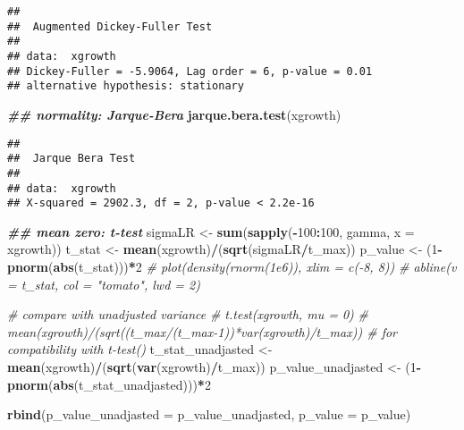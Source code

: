 \documentclass[
]{book}
\newenvironment{Shaded}{\begin{snugshade}}{\end{snugshade}}
\newcommand{\AttributeTok}[1]{\textcolor[rgb]{0.13,0.29,0.53}{#1}}
\newcommand{\CommentTok}[1]{\textcolor[rgb]{0.56,0.35,0.01}{\textit{#1}}}
\newcommand{\DecValTok}[1]{\textcolor[rgb]{0.00,0.00,0.81}{#1}}
\newcommand{\DocumentationTok}[1]{\textcolor[rgb]{0.56,0.35,0.01}{\textbf{\textit{#1}}}}
\newcommand{\FunctionTok}[1]{\textcolor[rgb]{0.13,0.29,0.53}{\textbf{#1}}}
\newcommand{\NormalTok}[1]{#1}
\newcommand{\OtherTok}[1]{\textcolor[rgb]{0.56,0.35,0.01}{#1}}
\newcommand{\SpecialCharTok}[1]{\textcolor[rgb]{0.81,0.36,0.00}{\textbf{#1}}}
\begin{document}
\begin{verbatim}
## 
##  Augmented Dickey-Fuller Test
## 
## data:  xgrowth
## Dickey-Fuller = -5.9064, Lag order = 6, p-value = 0.01
## alternative hypothesis: stationary
\end{verbatim}

\begin{Shaded}
\begin{Highlighting}[]
\DocumentationTok{\#\# normality: Jarque{-}Bera}
\FunctionTok{jarque.bera.test}\NormalTok{(xgrowth)}
\end{Highlighting}
\end{Shaded}

\begin{verbatim}
## 
##  Jarque Bera Test
## 
## data:  xgrowth
## X-squared = 2902.3, df = 2, p-value < 2.2e-16
\end{verbatim}

\begin{Shaded}
\begin{Highlighting}[]
\DocumentationTok{\#\# mean zero: t{-}test}
\NormalTok{sigmaLR }\OtherTok{\textless{}{-}} \FunctionTok{sum}\NormalTok{(}\FunctionTok{sapply}\NormalTok{(}\SpecialCharTok{{-}}\DecValTok{100}\SpecialCharTok{:}\DecValTok{100}\NormalTok{, gamma, }\AttributeTok{x =}\NormalTok{ xgrowth))}
\NormalTok{t\_stat  }\OtherTok{\textless{}{-}} \FunctionTok{mean}\NormalTok{(xgrowth)}\SpecialCharTok{/}\NormalTok{(}\FunctionTok{sqrt}\NormalTok{(sigmaLR}\SpecialCharTok{/}\NormalTok{t\_max))}
\NormalTok{p\_value }\OtherTok{\textless{}{-}}\NormalTok{ (}\DecValTok{1}\SpecialCharTok{{-}}\FunctionTok{pnorm}\NormalTok{(}\FunctionTok{abs}\NormalTok{(t\_stat)))}\SpecialCharTok{*}\DecValTok{2}
\CommentTok{\# plot(density(rnorm(1e6)), xlim = c({-}8, 8))}
\CommentTok{\# abline(v = t\_stat, col = "tomato", lwd = 2)}

\CommentTok{\# compare with unadjusted variance}
\CommentTok{\# t.test(xgrowth, mu = 0)}
\CommentTok{\# mean(xgrowth)/(sqrt((t\_max/(t\_max{-}1))*var(xgrowth)/t\_max)) \# for compatibility with t{-}test()}
\NormalTok{t\_stat\_unadjasted }\OtherTok{\textless{}{-}} \FunctionTok{mean}\NormalTok{(xgrowth)}\SpecialCharTok{/}\NormalTok{(}\FunctionTok{sqrt}\NormalTok{(}\FunctionTok{var}\NormalTok{(xgrowth)}\SpecialCharTok{/}\NormalTok{t\_max))}
\NormalTok{p\_value\_unadjasted }\OtherTok{\textless{}{-}}\NormalTok{ (}\DecValTok{1}\SpecialCharTok{{-}}\FunctionTok{pnorm}\NormalTok{(}\FunctionTok{abs}\NormalTok{(t\_stat\_unadjasted)))}\SpecialCharTok{*}\DecValTok{2}

\FunctionTok{rbind}\NormalTok{(}\AttributeTok{p\_value\_unadjasted =}\NormalTok{ p\_value\_unadjasted,}
      \AttributeTok{p\_value =}\NormalTok{ p\_value)}
\end{Highlighting}
\end{Shaded}
\end{document}
